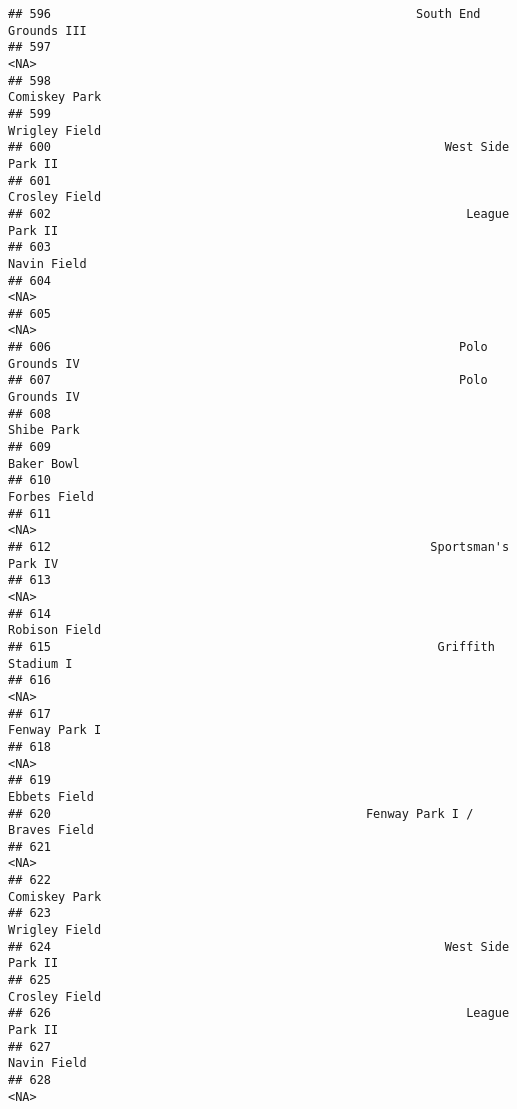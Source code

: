 \documentclass[]{article}
\begin{document}
\begin{verbatim}
## 596                                                   South End Grounds III
## 597                                                                    <NA>
## 598                                                           Comiskey Park
## 599                                                           Wrigley Field
## 600                                                       West Side Park II
## 601                                                           Crosley Field
## 602                                                          League Park II
## 603                                                             Navin Field
## 604                                                                    <NA>
## 605                                                                    <NA>
## 606                                                         Polo Grounds IV
## 607                                                         Polo Grounds IV
## 608                                                              Shibe Park
## 609                                                              Baker Bowl
## 610                                                            Forbes Field
## 611                                                                    <NA>
## 612                                                     Sportsman's Park IV
## 613                                                                    <NA>
## 614                                                           Robison Field
## 615                                                      Griffith Stadium I
## 616                                                                    <NA>
## 617                                                           Fenway Park I
## 618                                                                    <NA>
## 619                                                            Ebbets Field
## 620                                            Fenway Park I / Braves Field
## 621                                                                    <NA>
## 622                                                           Comiskey Park
## 623                                                           Wrigley Field
## 624                                                       West Side Park II
## 625                                                           Crosley Field
## 626                                                          League Park II
## 627                                                             Navin Field
## 628                                                                    <NA>

\end{verbatim}
\end{document}
